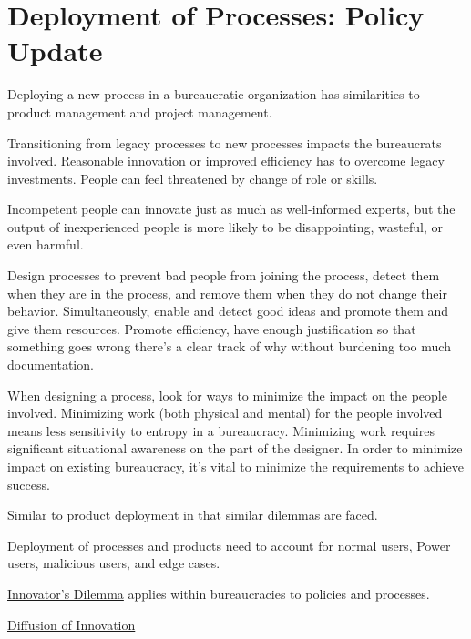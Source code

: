 \section{Deployment of Processes: Policy Update}

Deploying a new process in a bureaucratic organization has similarities to product management and project management. 

Transitioning from legacy processes to new processes impacts the bureaucrats involved. Reasonable innovation or improved efficiency has to overcome legacy investments. People can feel threatened by change of role or skills.  

Incompetent people can innovate just as much as well-informed experts, but the output of inexperienced people is more likely to be disappointing, wasteful, or even harmful. 

Design processes to prevent bad people from joining the process, detect them when they are in the process, and remove them when they do not change their behavior. Simultaneously, enable and detect good ideas and promote them and give them resources.
Promote efficiency, have enough justification so that something goes wrong there's a clear track of why without burdening too much documentation.


When designing a process, look for ways to minimize the impact on the people involved. Minimizing work (both physical and mental) for the people involved means less sensitivity to entropy in a bureaucracy. Minimizing work requires significant situational awareness on the part of the designer. In order to minimize impact on existing bureaucracy, it's vital to minimize the requirements to achieve success.


Similar to product deployment in that similar dilemmas are faced.

Deployment of processes and products need to account for 
normal users, Power users, malicious users, and edge cases.

\href{https://en.m.wikipedia.org/wiki/The_Innovator's_Dilemma}{Innovator's Dilemma} applies within bureaucracies to policies and processes.

\href{https://en.wikipedia.org/wiki/Diffusion_of_innovations}{Diffusion of Innovation}



